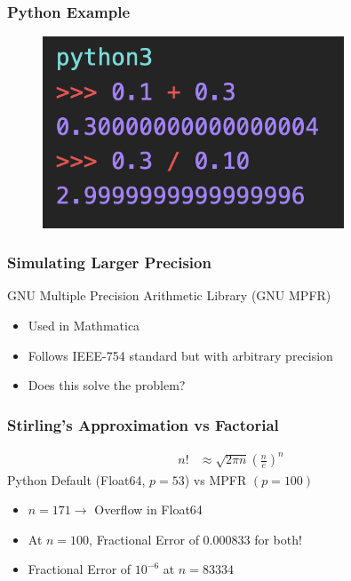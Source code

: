 \documentclass[10pt]{beamer}
\begin{document}
\begin{frame}
    \frametitle{Python Example}
    \begin{figure}
        \centering
        \includegraphics[width=0.8\textwidth]{pythoneg.png}
    \end{figure}
\end{frame}
\begin{frame}
    \frametitle{Simulating Larger Precision}
    GNU Multiple Precision Arithmetic Library (GNU MPFR)
    \begin{itemize}
        \item Used in Mathmatica
        \item Follows IEEE-754 standard but with arbitrary precision
        \item Does this solve the problem?
    \end{itemize}
\end{frame}
\begin{frame}
    \frametitle{Stirling's Approximation vs Factorial}
    \begin{align*}
        n! &\approx \sqrt{2\pi n} \left(\frac{n}{e}\right)^n
    \end{align*}
    \pause
    Python Default (Float64, $p=53$) vs MPFR $(p = 100)$
    \begin{itemize}
        \item $n = 171 \to $ Overflow in Float64
        \item At $n = 100$, Fractional Error of $0.000833$ for both!
        \item Fractional Error of $10^{-6}$ at $n = 83334$ 
    \end{itemize}
\end{frame}
\end{document}
